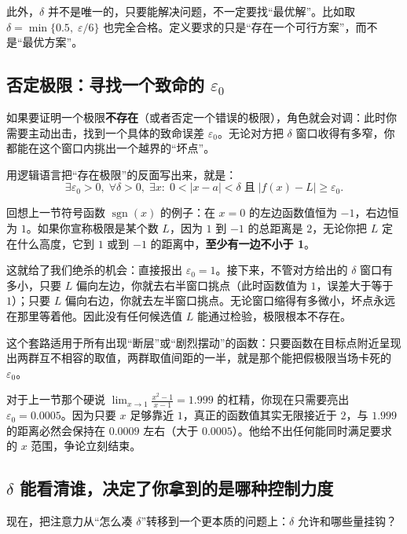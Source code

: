 此外，\(\delta\) 并不是唯一的，只要能解决问题，不一定要找``最优解''。比如取 \(\delta=\min\{0.5,\;\varepsilon/6\}\) 也完全合格。定义要求的只是``存在一个可行方案''，而不是``最优方案''。

\subsection{否定极限：寻找一个致命的 \texorpdfstring{\(\varepsilon_0\)}{epsilon0}}

如果要证明一个极限\textbf{不存在}（或者否定一个错误的极限），角色就会对调：此时你需要主动出击，找到一个具体的致命误差 \(\varepsilon_0\)。无论对方把 \(\delta\) 窗口收得有多窄，你都能在这个窗口内挑出一个越界的``坏点''。

用逻辑语言把``存在极限''的反面写出来，就是：
\[
\exists\varepsilon_0>0,\;\forall\delta>0,\;
\exists x:\;0<|x-a|<\delta\;\text{且}\;|f(x)-L|\ge\varepsilon_0.
\]

回想上一节符号函数 \(\operatorname{sgn}(x)\) 的例子：在 \(x=0\) 的左边函数值恒为 \(-1\)，右边恒为 \(1\)。如果你宣称极限是某个数 \(L\)，因为 \(1\) 到 \(-1\) 的总距离是 \(2\)，无论你把 \(L\) 定在什么高度，它到 \(1\) 或到 \(-1\) 的距离中，\textbf{至少有一边不小于 1}。

这就给了我们绝杀的机会：直接报出 \(\varepsilon_0=1\)。接下来，不管对方给出的 \(\delta\) 窗口有多小，只要 \(L\) 偏向左边，你就去右半窗口挑点（此时函数值为 \(1\)，误差大于等于 \(1\)）；只要 \(L\) 偏向右边，你就去左半窗口挑点。无论窗口缩得有多微小，坏点永远在那里等着他。因此没有任何候选值 \(L\) 能通过检验，极限根本不存在。

这个套路适用于所有出现``断层''或``剧烈摆动''的函数：只要函数在目标点附近呈现出两群互不相容的取值，两群取值间距的一半，就是那个能把假极限当场卡死的 \(\varepsilon_0\)。

对于上一节那个硬说 \(\lim_{x\to1}\frac{x^2-1}{x-1}=1.999\) 的杠精，你现在只需要亮出 \(\varepsilon_0=0.0005\)。因为只要 \(x\) 足够靠近 \(1\)，真正的函数值其实无限接近于 \(2\)，与 \(1.999\) 的距离必然会保持在 \(0.0009\) 左右（大于 \(0.0005\)）。他给不出任何能同时满足要求的 \(x\) 范围，争论立刻结束。

\subsection{\texorpdfstring{\(\delta\)}{delta} 能看清谁，决定了你拿到的是哪种控制力度}

现在，把注意力从``怎么凑 \(\delta\)''转移到一个更本质的问题上：\(\delta\) 允许和哪些量挂钩？

